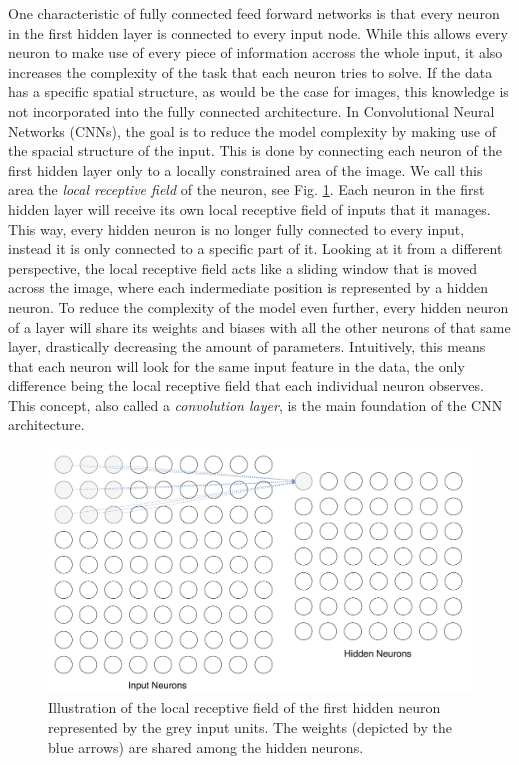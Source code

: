 One characteristic of fully connected feed forward networks is that
every neuron in the first hidden layer is connected to every input
node. While this allows every neuron to make use of every piece of
information accross the whole input, it also increases the complexity
of the task that each neuron tries to solve. If the data has a
specific spatial structure, as would be the case for images, this
knowledge is not incorporated into the fully connected
architecture. In Convolutional Neural Networks (CNNs), the goal is to
reduce the model complexity by making use of the spacial structure of
the input. This is done by connecting each neuron of the first hidden
layer only to a locally constrained area of the image. We call this
area the \textit{local receptive field} of the neuron, see
Fig. \ref{fig:receptive-field}. Each neuron in
the first hidden layer will receive its own local receptive field of
inputs that it manages. This way, every hidden
neuron is no longer fully connected to every input, instead it is only connected to a
specific part of it. Looking at it
from a different perspective, the local receptive field acts like a
sliding window that is moved across the image, where each indermediate
position is represented by a hidden neuron. To reduce the complexity
of the model even further, every hidden neuron of a layer will share
its weights and biases with all the other neurons of that same layer,
drastically decreasing the amount of parameters. Intuitively, this
means that each neuron will look for the same input feature in the
data, the only difference being the local receptive field that each
individual neuron observes. This concept, also called a
\textit{convolution layer}, is the main foundation of the CNN
architecture.
\begin{figure}[h]
  \centering
  \includegraphics[width=\textwidth]{../figures/receptive_field}
  \caption{Illustration of the local receptive field of the first
    hidden neuron represented by the grey input units. The weights
    (depicted by the blue arrows) are shared among the hidden
    neurons.}
  \label{fig:receptive-field}
\end{figure}

